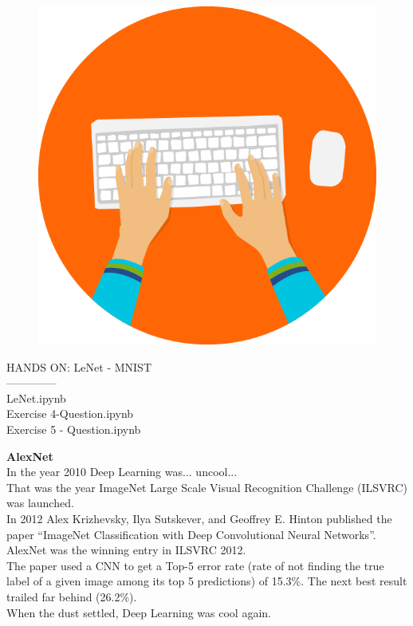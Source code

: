 \documentclass[10pt, compress]{beamer}
\begin{document}
\begin{frame}
  \vspace{.5cm}
  \begin{figure}
    \includegraphics[width=.2\linewidth, left]{imgs/hands_on_1}
  \end{figure}
  HANDS ON: LeNet - MNIST \\
  -------------- \\
  LeNet.ipynb \\
  Exercise 4-Question.ipynb \\
  Exercise 5 - Question.ipynb
\end{frame}

\begin{frame}
  \vspace{0.6cm}
  \textbf{AlexNet} \\ \hfill \break
  In the year 2010 Deep Learning was... uncool... \\ \hfill \break
  That was the year ImageNet Large Scale Visual Recognition Challenge (ILSVRC) was launched. \\
  In 2012 Alex Krizhevsky, Ilya Sutskever, and Geoffrey E. Hinton published the paper ``ImageNet Classification with Deep Convolutional Neural Networks”. \\
  AlexNet was the winning entry in ILSVRC 2012.\\
  The paper used a CNN to get a Top-5 error rate (rate of not finding the true label of a given image among its top 5 predictions) of 15.3\%. The next best result trailed far behind (26.2\%).\\
  When the dust settled, Deep Learning was cool again.
\end{frame}
\end{document}
